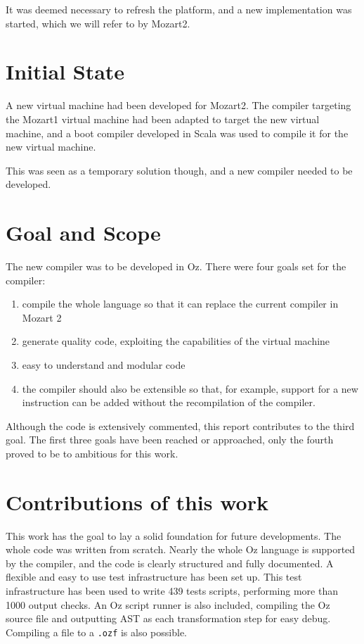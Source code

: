 \documentclass[a4paper]{memoir}
\begin{document}
It was deemed necessary to refresh the platform, and a new implementation was started, which we will refer to by Mozart2.



\section{Initial State}
A new virtual machine had been developed for Mozart2. The compiler
targeting the Mozart1 virtual machine had been adapted to target the new
virtual machine, and a boot compiler developed in Scala was used to compile it
for the new virtual machine.

This was seen as a temporary solution though, and a new compiler needed
to be developed. 


\section{Goal and Scope}
The new compiler was to be developed in Oz.
There were four goals set for the compiler:
\begin{enumerate}
  \item compile the whole language so that it can replace the current compiler in Mozart 2
  \item generate quality code, exploiting the capabilities of the virtual machine
  \item easy to understand and modular code
  \item the compiler should also be extensible so that, for example, support for a new instruction can be added without the recompilation of the compiler.
\end{enumerate}
Although the code is extensively commented, this report contributes to the third goal.
The first three goals have been reached or approached, only the fourth proved to be to ambitious for this work.

\section{Contributions of this work}
This work has the goal to lay a solid foundation for future developments. The whole code was written from scratch.
Nearly the whole Oz language is supported by the compiler, and the code is clearly structured and fully documented.
A flexible and easy to use test infrastructure has been set up. This test infrastructure has been used
to write 439 tests scripts, performing more than 1000 output checks.
An Oz script runner is also included, compiling the Oz source file and outputting AST as each transformation step for easy debug.
Compiling a file to a \lstinline!.ozf! is also possible.
\end{document}
